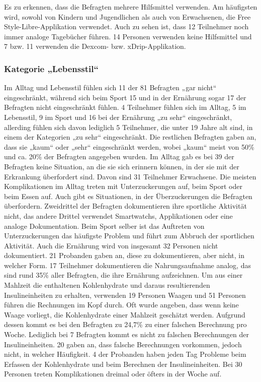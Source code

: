 \documentclass[a4paper,11pt]{article}%
\renewcommand{\\}{\vspace*{0.5\baselineskip} \newline}
\begin{document}
	Es zu erkennen, dass die Befragten mehrere Hilfsmittel verwenden. Am häufigsten wird, sowohl von Kindern und Jugendlichen als auch von Erwachsenen, die Free Style-Libre-Applikation verwendet. Auch zu sehen ist, dass 12 Teilnehmer noch immer analoge Tagebücher führen. 14 Personen verwenden keine Hilfsmittel und 7 bzw. 11 verwenden die Dexcom- bzw. xDrip-Applikation.
	\subsubsection{Kategorie „Lebensstil“}
	Im Alltag und Lebensstil fühlen sich 11 der 81 Befragten „gar nicht“ eingeschränkt, während sich beim Sport 15 und in der Ernährung sogar 17 der Befragten nicht eingeschränkt fühlen. 4 Teilnehmer fühlen sich im Alltag, 5 im Lebensstil, 9 im Sport und 16 bei der Ernährung „zu sehr“ eingeschränkt, allerding fühlen sich davon lediglich 5 Teilnehmer, die unter 19 Jahre alt sind, in einem der Kategorien „zu sehr“ eingeschränkt. Die restlichen Befragten gaben an, dass sie „kaum“ oder „sehr“ eingeschränkt werden, wobei „kaum“ meist von 50\% und ca. 20\% der Befragten angegeben wurden.\newline
	Im Alltag gab es bei 39 der Befragten keine Situation, an die sie sich erinnern können, in der sie mit der Erkrankung überfordert sind. Davon sind 31 Teilnehmer Erwachsene. Die meisten Komplikationen im Alltag treten mit Unterzuckerungen auf, beim Sport oder beim Essen auf. Auch gibt es Situationen, in der Überzuckerungen die Befragten überfordern.\newline
	Zweidrittel der Befragten dokumentieren ihre sportliche Aktivität nicht, das andere Drittel verwendet Smartwatchs, Applikationen oder eine analoge Dokumentation. Beim Sport selber ist das Auftreten von Unterzuckerungen das häufigste Problem und führt zum Abbruch der sportlichen Aktivität.\newline
	Auch die Ernährung wird von insgesamt 32 Personen nicht dokumentiert. 21 Probanden gaben an, diese zu dokumentieren, aber nicht, in welcher Form. 17 Teilnehmer dokumentieren die Nahrungsaufnahme analog, das sind rund 35\% aller Befragten, die ihre Ernährung aufzeichnen.\newline
	Um aus einer Mahlzeit die enthaltenen Kohlenhydrate und daraus resultierenden Insulineinheiten zu erhalten, verwenden 19 Personen Waagen und 51 Personen führen die Rechnungen im Kopf durch. Oft wurde angeben, dass wenn keine Waage vorliegt, die Kohlenhydrate einer Mahlzeit geschätzt werden. Aufgrund dessen kommt es bei den Befragten zu 24,7\% zu einer falschen Berechnung pro Woche. Lediglich bei 7 Befragten kommt es nicht zu falschen Berechnungen der Insulineinheiten. 20 gaben an, dass falsche Berechnungen vorkommen, jedoch nicht, in welcher Häufigkeit. 4 der Probanden haben jeden Tag Probleme beim Erfassen der Kohlenhydrate und beim Berechnen der Insulineinheiten. Bei 30 Personen treten Komplikationen dreimal oder öfters in der Woche auf.
\end{document}
